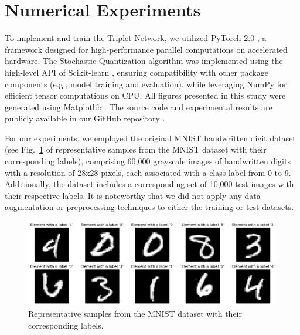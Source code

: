 \section{Numerical Experiments}

To implement and train the Triplet Network, we utilized PyTorch 2.0 \cite{Ansel_2024}, a framework designed for high-performance parallel computations on accelerated hardware. The Stochastic Quantization algorithm was implemented using the high-level API of Scikit-learn \cite{Pedregosa_2011}, ensuring compatibility with other package components (e.g., model training and evaluation), while leveraging NumPy \cite{harris2020array} for efficient tensor computations on CPU. All figures presented in this study were generated using Matplotlib \cite{Hunter_2007}. The source code and experimental results are publicly available in our GitHub repository \cite{Kozyriev_2024}.

For our experiments, we employed the original MNIST handwritten digit dataset \cite{lecun2010mnist} (see Fig.~\ref{mnist:fig} of representative samples from the MNIST dataset with their corresponding labels), comprising 60,000 grayscale images of handwritten digits with a resolution of 28x28 pixels, each associated with a class label from 0 to 9. Additionally, the dataset includes a corresponding set of 10,000 test images with their respective labels. It is noteworthy that we did not apply any data augmentation or preprocessing techniques to either the training or test datasets.

\begin{figure}
    \centering
    \includegraphics[width=\textwidth]{figures/dataset.png}
    \caption{Representative samples from the MNIST dataset \cite{lecun2010mnist} with their corresponding labels.}
    \label{mnist:fig}
\end{figure}

